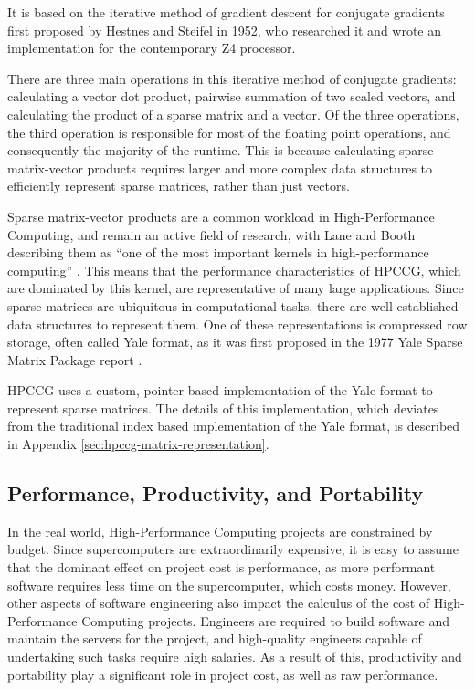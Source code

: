 It is based on the iterative method of gradient descent for conjugate gradients first proposed by Hestnes and Steifel in 1952\cite{hestenesMethodsConjugateGradients1952}, who researched it and wrote an implementation for the contemporary Z4 processor.

There are three main operations in this iterative method of conjugate gradients: calculating a vector dot product, pairwise summation of two scaled vectors, and calculating the product of a sparse matrix and a vector. Of the three operations, the third operation is responsible for most of the floating point operations, and consequently the majority of the runtime. This is because calculating sparse matrix-vector products requires larger and more complex data structures to efficiently represent sparse matrices, rather than just vectors.

Sparse matrix-vector products are a common workload in High-Performance Computing, and remain an active field of research, with Lane and Booth describing them as ``one of the most important kernels in high-performance computing'' \cite{laneHeterogeneousSparseMatrixVector2023}. This means that the performance characteristics of HPCCG, which are dominated by this kernel, are representative of many large applications. Since sparse matrices are ubiquitous in computational tasks, there are well-established data structures to represent them. One of these representations is compressed row storage, often called Yale format, as it was first proposed in the 1977 Yale Sparse Matrix Package report \cite{eisenstat1977yale}.

HPCCG uses a custom, pointer based implementation of the Yale format to represent sparse matrices. The details of this implementation, which deviates from the traditional index based implementation of the Yale format, is described in Appendix \ref{sec:hpccg-matrix-representation}.

\subsection{Performance, Productivity, and Portability}
\label{ssec:p3hpc} %

In the real world, High-Performance Computing projects are constrained by budget. Since supercomputers are extraordinarily expensive, it is easy to assume that the dominant effect on project cost is performance, as more performant software requires less time on the supercomputer, which costs money. However, other aspects of software engineering also impact the calculus of the cost of High-Performance Computing projects. Engineers are required to build software and maintain the servers for the project, and high-quality engineers capable of undertaking such tasks require high salaries. As a result of this, productivity and portability play a significant role in project cost, as well as raw performance.


